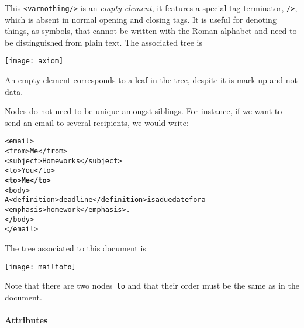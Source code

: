 This \verb|<varnothing/>| is an \emph{empty element}, it features a
special tag terminator, \verb|/>|, which is absent in normal opening
and closing tags. It is useful for denoting things, as symbols, that
cannot be written with the Roman alphabet and need to be distinguished
from plain text. The associated tree is
\begin{center}
\texttt{[image: axiom]}
\end{center}
An empty element corresponds to a leaf in the \XML tree, despite it is
mark\hyp{}up and not data.

Nodes do not need to be unique amongst siblings. For instance, if we
want to send an email to several recipients, we would write:
\begin{alltt}
<email>
  <from>Me</from>
  <subject>Homeworks</subject>
  <to>You</to>
  \textbf{<to>Me</to>}
  <body>
  A <definition>deadline</definition> is a due date for a
<emphasis>homework</emphasis>.
  </body>
</email>
\end{alltt}
The \XML tree associated to this \XML document is
\begin{center}
\texttt{[image: mailtoto]}
\end{center}
Note that there are two nodes~\texttt{to} and that their order must be
the same as in the \XML document.

\paragraph{Attributes}

